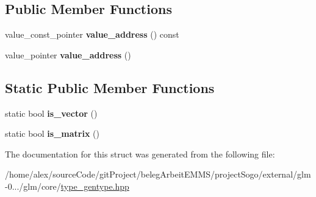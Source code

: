 \subsection*{Public Member Functions}
\begin{DoxyCompactItemize}
\item 
\hypertarget{structglm_1_1detail_1_1genType_a63fb77e77082f34c0a0d7faa0906f7f4}{value\-\_\-const\-\_\-pointer {\bfseries value\-\_\-address} () const }\label{structglm_1_1detail_1_1genType_a63fb77e77082f34c0a0d7faa0906f7f4}

\item 
\hypertarget{structglm_1_1detail_1_1genType_a146973ec142766743080c1895a9e3c65}{value\-\_\-pointer {\bfseries value\-\_\-address} ()}\label{structglm_1_1detail_1_1genType_a146973ec142766743080c1895a9e3c65}

\end{DoxyCompactItemize}
\subsection*{Static Public Member Functions}
\begin{DoxyCompactItemize}
\item 
\hypertarget{structglm_1_1detail_1_1genType_ae83087df55201bdc46a37decf3d1c34c}{static bool {\bfseries is\-\_\-vector} ()}\label{structglm_1_1detail_1_1genType_ae83087df55201bdc46a37decf3d1c34c}

\item 
\hypertarget{structglm_1_1detail_1_1genType_a78c650375558d5e2ccfba383cdb59479}{static bool {\bfseries is\-\_\-matrix} ()}\label{structglm_1_1detail_1_1genType_a78c650375558d5e2ccfba383cdb59479}

\end{DoxyCompactItemize}


The documentation for this struct was generated from the following file\-:\begin{DoxyCompactItemize}
\item 
/home/alex/source\-Code/git\-Project/beleg\-Arbeit\-E\-M\-M\-S/project\-Sogo/external/glm-\/0.../glm/core/\hyperlink{type__gentype_8hpp}{type\-\_\-gentype.\-hpp}\end{DoxyCompactItemize}
